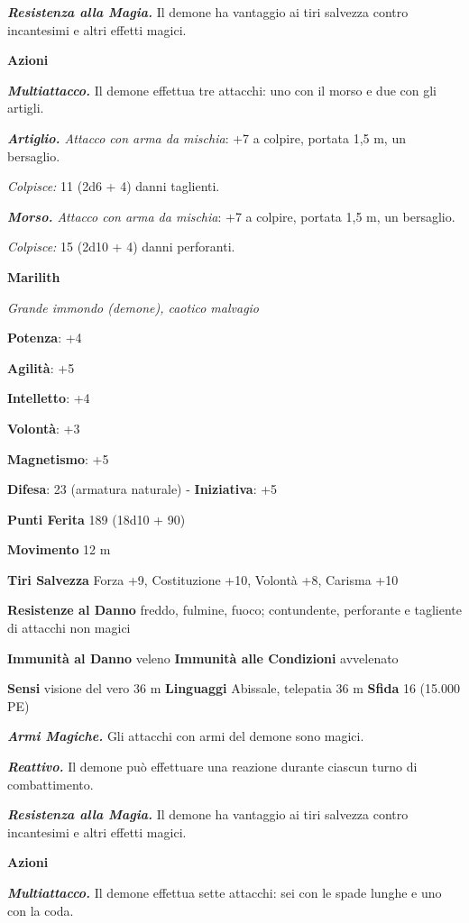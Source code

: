 \begin{multicols}{2}
\emph{\textbf{Resistenza alla Magia.}} Il demone ha vantaggio ai tiri
salvezza contro incantesimi e altri effetti magici.

\textbf{Azioni}

\emph{\textbf{Multiattacco.}} Il demone effettua tre attacchi: uno con
il morso e due con gli artigli.

\emph{\textbf{Artiglio.} Attacco con arma da mischia}: +7 a colpire,
portata 1,5 m, un bersaglio.

\emph{Colpisce:} 11 (2d6 + 4) danni taglienti.

\emph{\textbf{Morso.} Attacco con arma da mischia}: +7 a colpire,
portata 1,5 m, un bersaglio.

\emph{Colpisce:} 15 (2d10 + 4) danni perforanti.

\textbf{Marilith}

\emph{Grande immondo (demone), caotico malvagio}

\textbf{Potenza}: +4

\textbf{Agilità}: +5

\textbf{Intelletto}: +4

\textbf{Volontà}: +3

\textbf{Magnetismo}: +5

\textbf{Difesa}: 23 (armatura naturale) - \textbf{Iniziativa}: +5

\textbf{Punti Ferita} 189 (18d10 + 90)

\textbf{Movimento} 12 m

\textbf{Tiri Salvezza} Forza +9, Costituzione +10, Volontà +8, Carisma
+10

\textbf{Resistenze al Danno} freddo, fulmine, fuoco; contundente,
perforante e tagliente di attacchi non magici

\textbf{Immunità al Danno} veleno \textbf{Immunità alle Condizioni}
avvelenato

\textbf{Sensi} visione del vero 36 m
\textbf{Linguaggi} Abissale, telepatia 36 m \textbf{Sfida} 16 (15.000
PE)

\emph{\textbf{Armi Magiche.}} Gli attacchi con armi del demone sono
magici.

\emph{\textbf{Reattivo.}} Il demone può effettuare una reazione durante
ciascun turno di combattimento.

\emph{\textbf{Resistenza alla Magia.}} Il demone ha vantaggio ai tiri
salvezza contro incantesimi e altri effetti magici.

\textbf{Azioni}

\emph{\textbf{Multiattacco.}} Il demone effettua sette attacchi: sei con
le spade lunghe e uno con la coda.


\end{multicols}
